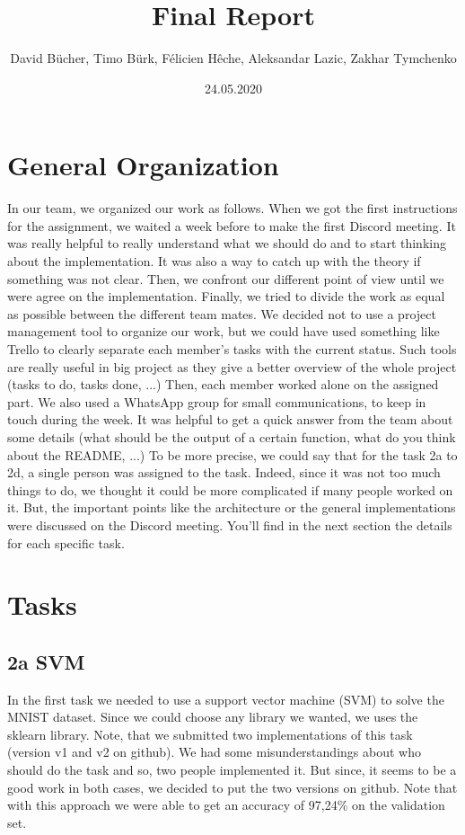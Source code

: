 \documentclass[12pt]{article}
\begin{document}
\title{Final Report}
\author{David Bücher, Timo Bürk, Félicien Hêche, Aleksandar Lazic, Zakhar Tymchenko }
\date{24.05.2020}
\maketitle


\section*{General Organization}
In our team, we organized our work as follows.
\newline When we got the first instructions for the assignment, we waited a week before to make the first Discord meeting. It was really helpful to really understand what we should do and to start thinking about the implementation. It was also a way to catch up with the theory if something was not clear. Then, we confront our different point of view until we were agree on the implementation. Finally, we tried to divide the work as equal as possible between the different team mates.
\newline We decided not to use a project management tool to organize our work, but we could have used something like Trello to clearly separate each member's tasks with the current status. Such tools are really useful in big project as they give a better overview of the whole project (tasks to do, tasks done, ...)
\newline Then, each member worked alone on the assigned part. We also used a WhatsApp group for small communications, to keep in touch during the week. It was helpful to get a quick answer from the team about some details (what should be the output of a certain function, what do you think about the README, ...)
\newline  To be more precise, we could say that for the task 2a to 2d, a single person was assigned to the task. Indeed, since it was not too much things to do, we thought it could be more complicated if many people worked on it. But, the important points like the architecture or the general implementations were discussed on the Discord meeting. You'll find in the next section the details for each specific task.
\section*{Tasks}
\subsection*{2a SVM}
In the first task we needed to use a support vector machine (SVM) to solve the MNIST dataset. Since we could choose any library we wanted, we uses the sklearn library. Note, that we submitted two implementations of this task (version v1 and v2 on github). We had some misunderstandings about who should do the task and so, two people implemented it. But since, it seems to be a good work in both cases, we decided to put the two versions on github. Note that with this approach we were able to get an accuracy of 97,24\% on the validation set.
\end{document}
